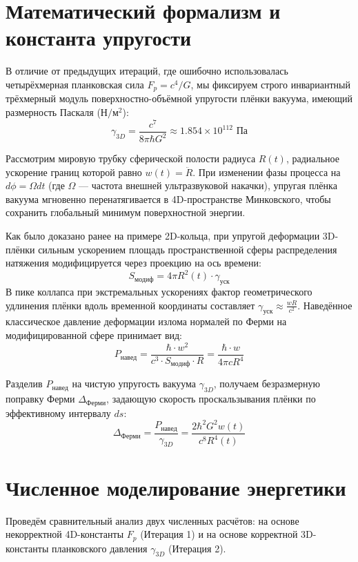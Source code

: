 \documentclass[twocolumn,PRL,amsmath,amssymb]{revtex4-1}
\begin{document}
\section{Математический формализм и константа упругости}
В отличие от предыдущих итераций, где ошибочно использовалась четырёхмерная планковская сила $F_p = c^4/G$, мы фиксируем строго инвариантный трёхмерный модуль поверхностно-объёмной упругости плёнки вакуума, имеющий размерность Паскаля ($\text{Н}/\text{м}^2$):
\begin{equation}
\gamma_{3D} = \frac{c^7}{8\pi \hbar G^2} \approx 1.854 \times 10^{112} \text{ Па}
\end{equation}

Рассмотрим мировую трубку сферической полости радиуса $R(t)$, радиальное ускорение границ которой равно $w(t) = \ddot{R}$. При изменении фазы процесса на $d\phi = \Omega dt$ (где $\Omega$ --- частота внешней ультразвуковой накачки), упругая плёнка вакуума мгновенно перенатягивается в 4D-пространстве Минковского, чтобы сохранить глобальный минимум поверхностной энергии. 

Как было доказано ранее на примере 2D-кольца, при упругой деформации 3D-плёнки сильным ускорением площадь пространственной сферы распределения натяжения модифицируется через проекцию на ось времени:
\begin{equation}
S_{модиф} = 4\pi R^2(t) \cdot \gamma_{уск}
\end{equation}
В пике коллапса при экстремальных ускорениях фактор геометрического удлинения плёнки вдоль временной координаты составляет $\gamma_{уск} \approx \frac{w R}{c^2}$. Наведённое классическое давление деформации излома нормалей по Ферми на модифицированной сфере принимает вид:
\begin{equation}
P_{навед} = \frac{\hbar \cdot w^2}{c^3 \cdot S_{модиф} \cdot R} = \frac{\hbar \cdot w}{4\pi c R^4}
\end{equation}

Разделив $P_{навед}$ на чистую упругость вакуума $\gamma_{3D}$, получаем безразмерную поправку Ферми $\Delta_{Ферми}$, задающую скорость проскальзывания плёнки по эффективному интервалу $ds$:
\begin{equation}
\Delta_{Ферми} = \frac{P_{навед}}{\gamma_{3D}} = \frac{2 \hbar^2 G^2 w(t)}{c^8 R^4(t)}
\end{equation}

\section{Численное моделирование энергетики}
Проведём сравнительный анализ двух численных расчётов: на основе некорректной 4D-константы $F_p$ (Итерация 1) и на основе корректной 3D-константы планковского давления $\gamma_{3D}$ (Итерация 2).
\end{document}
